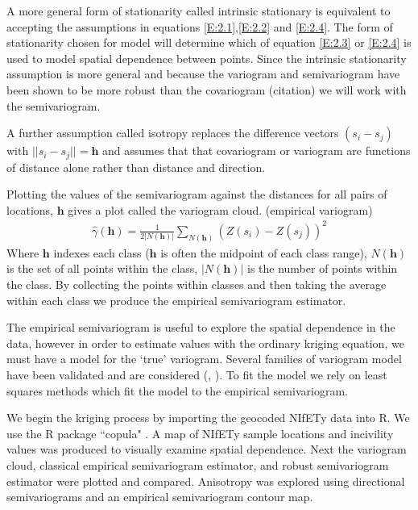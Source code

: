 A more general form of stationarity called intrinsic stationary is equivalent to accepting the assumptions in equations \ref{E:2.1},\ref{E:2.2} and \ref{E:2.4}. The form of stationarity chosen for model will determine which of equation \ref{E:2.3} or \ref{E:2.4} is used to model spatial dependence between points.  Since the intrinsic stationarity assumption is more general and because the variogram and semivariogram have been shown to be more robust than the covariogram (citation) we will work with the semivariogram.

A further assumption called isotropy replaces the difference vectors $(s_{i}-s_{j})$ with $||s_{i}-s_{j}||=\mathbf{h}$ and assumes that that covariogram or variogram are functions of distance alone rather than distance and direction.

Plotting the values of the semivariogram against the distances for all pairs of locations, $\mathbf{h}$ gives a plot called the variogram cloud.
(empirical variogram)
\begin{gather}
\hat{\gamma}(\mathbf{h})=\frac{1}{2|N(\mathbf{h})|}\sum_{N(\mathbf{h})}(Z(s_{i})-Z(s_{j}))^{2}
\end{gather}
Where $\mathbf{h}$ indexes each class ($\mathbf{h}$ is often the midpoint of each class range), $N(\mathbf{h})$ is the set of all points within the class,  $|N(\mathbf{h})|$ is the number of points within the class. By collecting the points within classes and then taking the average within each class we produce the empirical semivariogram estimator.

The empirical semivariogram is useful to explore the spatial dependence in the data, however in order to estimate values with the ordinary kriging equation, we must have a model for the `true' variogram.  Several families of variogram model have been validated and are considered (\cite{smith_bayesian_nodate}, \cite{biswas_bayesian_2009}).  To fit the model we rely on least squares methods which fit the model to the empirical semivariogram.
 
We begin the kriging process by importing the geocoded NIfETy data into R.  We use the R package ``copula" \cite{hofert_copula:_2016}. A map of NIfETy sample locations and incivility values was produced to visually examine spatial dependence. Next the variogram cloud, classical empirical semivariogram estimator, and robust semivariogram estimator were plotted and compared.  Anisotropy was explored using directional semivariograms and an empirical semivariogram contour map.

